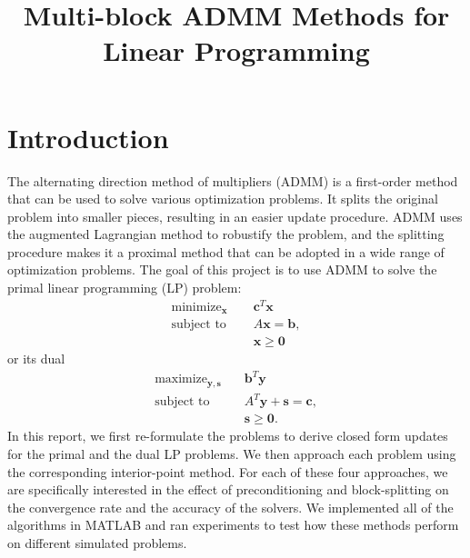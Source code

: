 \documentclass{article}
\title{Multi-block ADMM Methods for Linear Programming }
\author{\studentname}
\begin{document}
\maketitle
\vspace{0.1in}
\maketitle



\section{Introduction}
The alternating direction method of multipliers (ADMM) is a first-order method that can be used to solve various optimization problems. It splits the original problem into smaller pieces, resulting in an easier update procedure. ADMM uses the augmented Lagrangian method to robustify the problem, and the splitting procedure makes it a proximal method that can be adopted in a wide range of optimization problems.
\newline
\newline
The goal of this project is to use ADMM to solve the primal linear programming  (LP) problem:
\begin{align}
\text{minimize}_{\mathbf{x}} &\quad \mathbf{c}^T\mathbf{x} \tag{OPT1}\label{OPT1} \\
\text{subject to } &\quad  A \mathbf{x} = \mathbf{b},  \nonumber \\
&\quad \mathbf{x} \geq \mathbf{0} \nonumber 
\end{align}
or its dual
\begin{align}
\text{maximize}_{\mathbf{y}, \mathbf{s}} &\quad \mathbf{b}^T\mathbf{y}  \tag{OPT2}\label{OPT2} \\
\text{subject to } &\quad  A^T \mathbf{y}  + \mathbf{s} = \mathbf{c},  \nonumber \\
&\quad \mathbf{s} \geq \mathbf{0} \nonumber.
\end{align}
In this report, we first re-formulate the problems to derive closed form updates for the primal and the dual LP problems. We then approach each problem using the corresponding interior-point method. For each of these four approaches, we are specifically interested in the effect of preconditioning and block-splitting on the convergence rate and the accuracy of the solvers. We implemented all of the algorithms in MATLAB and ran experiments to test how these methods perform on different simulated problems.
\end{document}
